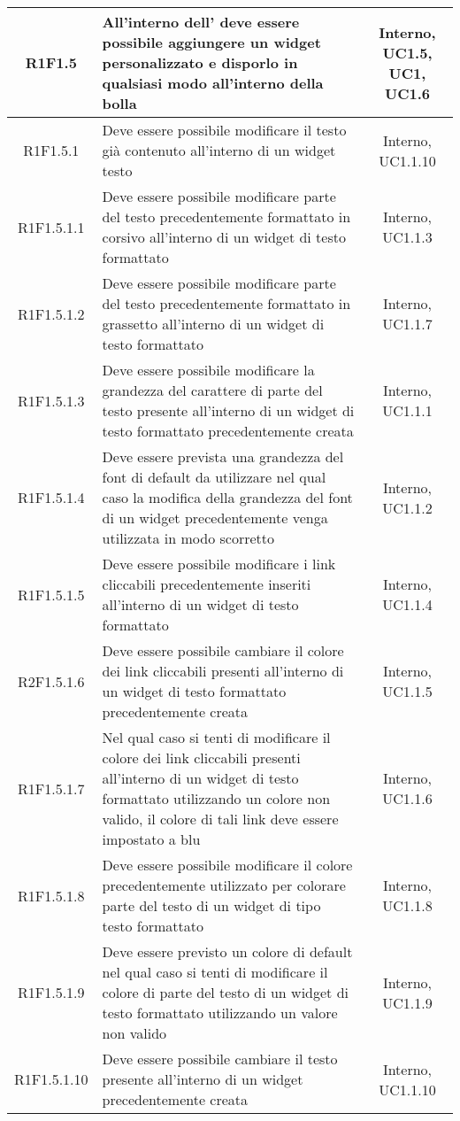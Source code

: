 \begin{longtable}{|c|>{\centering}m{7cm}|c|}
		\hline	
		R1F1.5 & All'interno dell'\termine{SDK} deve essere possibile aggiungere un widget personalizzato e disporlo in qualsiasi modo all'interno della bolla & Interno, UC1.5, UC1, UC1.6 \\ 
			\hline
		R1F1.5.1 & Deve essere possibile modificare il testo già contenuto all'interno di un widget testo & Interno, UC1.1.10 \\
		\hline
		R1F1.5.1.1 & Deve essere possibile modificare parte del testo precedentemente formattato in corsivo all'interno di un widget di testo formattato & Interno, UC1.1.3 \\
		\hline
		R1F1.5.1.2 & Deve essere possibile modificare parte del testo precedentemente formattato in grassetto all'interno di un widget di testo formattato & Interno, UC1.1.7 \\
		\hline
		R1F1.5.1.3 & Deve essere possibile modificare la grandezza del carattere di parte del testo presente all'interno di un widget di testo formattato precedentemente creata & Interno, UC1.1.1\\
		\hline
		R1F1.5.1.4 & Deve essere prevista una grandezza del font di default da utilizzare nel qual caso la modifica della grandezza del font di un widget precedentemente venga utilizzata in modo scorretto & Interno, UC1.1.2 \\
		\hline
		R1F1.5.1.5 & Deve essere possibile modificare i link cliccabili precedentemente inseriti all'interno di un widget di testo formattato & Interno, UC1.1.4 \\
		\hline
		R2F1.5.1.6 & Deve essere possibile cambiare il colore dei link cliccabili presenti all'interno di un widget di testo formattato precedentemente creata & Interno, UC1.1.5 \\
		\hline
		R1F1.5.1.7 & Nel qual caso si tenti di modificare il colore dei link cliccabili presenti all'interno di un widget di testo formattato utilizzando un colore non valido, il colore di tali link deve essere impostato a blu & Interno, UC1.1.6 \\
		\hline
		R1F1.5.1.8 & Deve essere possibile modificare il colore precedentemente utilizzato per colorare parte del testo di un widget di tipo testo formattato & Interno, UC1.1.8 \\
		\hline
		R1F1.5.1.9 & Deve essere previsto un colore di default nel qual caso si tenti di modificare il colore di parte del testo di un widget di testo formattato utilizzando un valore non valido & Interno, UC1.1.9 \\
		\hline
		R1F1.5.1.10 & Deve essere possibile cambiare il testo presente all'interno di un widget precedentemente creata & Interno, UC1.1.10 \\

\end{longtable}
